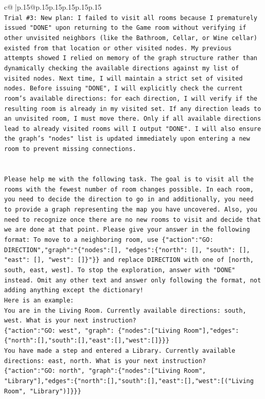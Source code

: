 \documentclass{article}
\begin{document}
{\begin{supertabular}{c@{$\;$}|p{.15\linewidth}@{}p{.15\linewidth}p{.15\linewidth}p{.15\linewidth}p{.15\linewidth}p{.15\linewidth}}
{{{\\ 
\texttt{Trial \#3: New plan: I failed to visit all rooms because I prematurely issued "DONE" upon returning to the Game room without verifying if other unvisited neighbors (like the Bathroom, Cellar, or Wine cellar) existed from that location or other visited nodes. My previous attempts showed I relied on memory of the graph structure rather than dynamically checking the available directions against my list of visited nodes. Next time, I will maintain a strict set of visited nodes. Before issuing "DONE", I will explicitly check the current room's available directions: for each direction, I will verify if the resulting room is already in my visited set. If any direction leads to an unvisited room, I must move there. Only if all available directions lead to already visited rooms will I output "DONE". I will also ensure the graph's "nodes" list is updated immediately upon entering a new room to prevent missing connections.} \\
\\ 
\\ 
\texttt{Please help me with the following task. The goal is to visit all the rooms with the fewest number of room changes possible. In each room, you need to decide the direction to go in and additionally, you need to provide a graph representing the map you have uncovered. Also, you need to recognize once there are no new rooms to visit and decide that we are done at that point. Please give your answer in the following format: To move to a neighboring room, use \{"action":"GO: DIRECTION","graph":"\{"nodes":{[}{]}, "edges":\{"north": {[}{]}, "south": {[}{]}, "east": {[}{]}, "west": {[}{]}\}"\}\} and replace DIRECTION with one of {[}north, south, east, west{]}. To stop the exploration, answer with "DONE" instead. Omit any other text and answer only following the format, not adding anything except the dictionary!} \\
\texttt{Here is an example: } \\
\texttt{You are in the Living Room. Currently available directions: south, west. What is your next instruction?} \\
\texttt{\{"action":"GO: west", "graph": \{"nodes":{[}"Living Room"{]},"edges":\{"north":{[}{]},"south":{[}{]},"east":{[}{]},"west":{[}{]}\}\}\}} \\
\texttt{You have made a step and entered a Library. Currently available directions: east, north. What is your next instruction?} \\
\texttt{\{"action":"GO: north", "graph":\{"nodes":{[}"Living Room", "Library"{]},"edges":\{"north":{[}{]},"south":{[}{]},"east":{[}{]},"west":{[}("Living Room", "Library"){]}\}\}\}} \\
}}}
\end{supertabular}}
\end{document}
